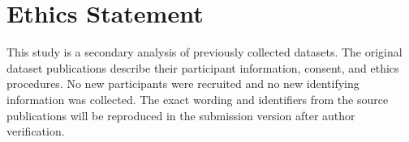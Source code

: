 \documentclass[12pt,draftclsnofoot,onecolumn]{IEEEtran}
\begin{document}
\section*{Ethics Statement}
This study is a secondary analysis of previously collected datasets. The
original dataset publications describe their participant information,
consent, and ethics procedures. No new participants were recruited and no new
identifying information was collected. The exact wording and identifiers from
the source publications will be reproduced in the submission version after
author verification.



\end{document}
